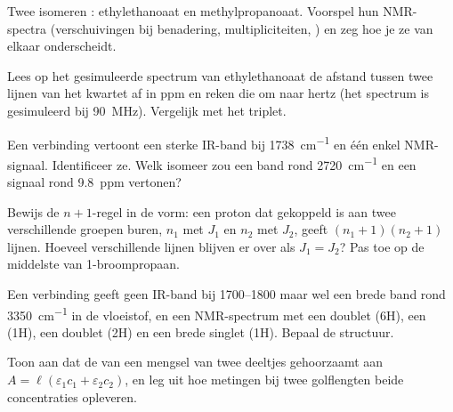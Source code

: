 \begin{exercise}[$\star\star$]\label{exo:b1:structure-spectroscopy:7}
Twee isomeren : ethylethanoaat en methylpropanoaat. Voorspel
hun NMR-spectra (verschuivingen bij benadering, multipliciteiten,
) en zeg hoe je ze van elkaar onderscheidt.
\end{exercise}

\begin{exercise}[$\star\star$]\label{exo:b1:structure-spectroscopy:8}
Lees op het gesimuleerde spectrum van ethylethanoaat de afstand tussen
twee lijnen van het kwartet af in ppm en reken die om naar hertz (het
spectrum is gesimuleerd bij \qty{90}{MHz}). Vergelijk met het triplet.
\end{exercise}

\begin{exercise}[$\star\star$]\label{exo:b1:structure-spectroscopy:9}
Een verbinding  vertoont een sterke IR-band bij
\qty{1738}{cm^{-1}} en één enkel NMR-signaal. Identificeer ze. Welk
isomeer zou een band rond \qty{2720}{cm^{-1}} en een signaal rond
\qty{9.8}{ppm} vertonen?
\end{exercise}

\begin{exercise}[$\star\star\star$]\label{exo:b1:structure-spectroscopy:10}
Bewijs de $n + 1$-regel in de vorm: een proton dat gekoppeld is aan twee
verschillende groepen buren, $n_1$ met $J_1$ en $n_2$ met $J_2$, geeft
$(n_1 +
1)(n_2 + 1)$ lijnen. Hoeveel verschillende lijnen blijven er over als
$J_1 = J_2$? Pas toe op de middelste  van 1-broompropaan.
\end{exercise}

\begin{exercise}[$\star\star\star$]\label{exo:b1:structure-spectroscopy:11}
Een verbinding  geeft geen IR-band bij 1700--1800 maar wel een
brede band rond \qty{3350}{cm^{-1}} in de vloeistof, en een NMR-spectrum
met een doublet (6H), een  (1H), een doublet (2H) en een brede
singlet (1H). Bepaal de structuur.
\end{exercise}

\begin{exercise}[$\star\star\star$]\label{exo:b1:structure-spectroscopy:12}
Toon aan dat de  van een mengsel van twee deeltjes gehoorzaamt
aan $A = \ell(\varepsilon_1c_1
+ \varepsilon_2c_2)$, en leg uit hoe metingen bij twee golflengten beide
concentraties opleveren.
\end{exercise}

